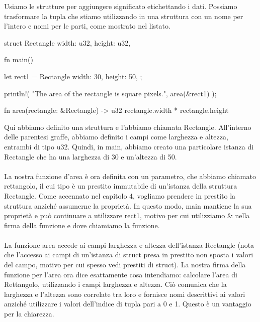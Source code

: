 \documentclass[11pt,a4paper]{article}
\begin{document}
Usiamo le strutture per aggiungere significato etichettando i dati. Possiamo trasformare la tupla che stiamo utilizzando in una struttura con un nome per l'intero e nomi per le parti, come mostrato nel listato.
\begin{rust}
struct Rectangle {
    width: u32,
    height: u32,
}

fn main() {
    let rect1 = Rectangle {
        width: 30,
        height: 50,
    };

    println!(
        "The area of the rectangle is {} square pixels.",
        area(&rect1)
    );
}

fn area(rectangle: &Rectangle) -> u32 {
    rectangle.width * rectangle.height
}
\end{rust}
Qui abbiamo definito una struttura e l'abbiamo chiamata Rectangle. All'interno delle parentesi graffe, abbiamo definito i campi come larghezza e altezza, entrambi di tipo u32. Quindi, in main, abbiamo creato una particolare istanza di Rectangle che ha una larghezza di 30 e un'altezza di 50.\\
\\
La nostra funzione d'area è ora definita con un parametro, che abbiamo chiamato rettangolo, il cui tipo è un prestito immutabile di un'istanza della struttura Rectangle. Come accennato nel capitolo 4, vogliamo prendere in prestito la struttura anziché assumerne la proprietà. In questo modo, main mantiene la sua proprietà e può continuare a utilizzare rect1, motivo per cui utilizziamo \& nella firma della funzione e dove chiamiamo la funzione.\\
\\
La funzione area accede ai campi larghezza e altezza dell'istanza Rectangle (nota che l'accesso ai campi di un'istanza di struct presa in prestito non sposta i valori del campo, motivo per cui spesso vedi prestiti di struct). La nostra firma della funzione per l'area ora dice esattamente cosa intendiamo: calcolare l'area di Rettangolo, utilizzando i campi larghezza e altezza. Ciò comunica che la larghezza e l'altezza sono correlate tra loro e fornisce nomi descrittivi ai valori anziché utilizzare i valori dell'indice di tupla pari a 0 e 1. Questo è un vantaggio per la chiarezza.
\end{document}
